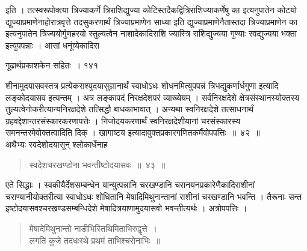 \documentclass[11pt, openany]{book}
\begin{document}
\begin{sloppypar}
इति । तत्स्वरूपोक्त्या त्रिज्याकर्णे त्रिराशिद्युज्या कोटिस्तदैकद्वित्रिराशिज्याकर्णेषु का इत्यनुपातेन कोटयो द्युज्याप्रमाणेनाहोरात्रवृत्ते तदसुकरणार्थं त्रिज्याप्रमाणेन साध्या इति द्युज्याप्रमाणेनैतास्तदा त्रिज्याप्रमाणेन का इत्यनुपातेन त्रिज्ययोर्गुणहरयो स्तुल्यत्वेन नाशादेकादिराशि ज्यास्त्रि राशिद्युज्यया गुण्याः स्वद्युज्यया भक्ता इत्युपपन्नाः । आसां धनूंव्येकादिरा\textendash
\end{sloppypar}


\newpage

\hspace{3cm}  गूढार्थप्रकाशकेन सहितः~। \hfill १४१
\vspace{1cm}

\begin{sloppypar}
शीनामुदयासवस्तत्र प्रत्येकराश्युदयासुज्ञानार्थं स्वाधोऽधः शोधनमित्युपपन्नं त्रिभद्युकर्णार्धगुणा इत्यादि लङ्कोदयासव इत्यन्तम् । अत्र लङ्कापदं निरक्षदेशपरं व्याख्येयम् । सर्वनिरक्षदेशे क्षेत्रसंस्थानस्योक्तस्य तुल्यत्वेनोकरीत्यान्यनिरक्षदेशे तत्सिद्धौ बाधकाभावात् । अन्यथा स्वनिरक्षदेशे तत्साधनार्थं ग्रहवद्देशान्तरसंस्कारकरणापत्तेः । निजोदयकरणार्थं स्वनिरक्षदेशीयानां चरसंस्कारस्य समनन्तरमेवोक्तत्वादिति दिक् । खागाष्टय इत्यादावुक्तप्रकारगणितकर्मैवोपपत्तिः~॥~४२~॥\\
\noindent अथैभ्यः स्वदेशोदयासून् श्लोकार्धेनाह\textendash
\end{sloppypar}


\begin{quote}
 {\ssi स्वदेशचरखण्डोना भवन्तीष्टोदयासवः~॥~४३~॥}
 \end{quote}

\begin{sloppypar}
 एते सिद्धाः । स्वकीयैर्देशसम्बन्धेन यान्युत्पन्नानि चरखण्डानि चरानयनप्रकारेणैकादिराशीनां चराण्यानीयोक्तरीत्या स्वाधोऽधः शोधितानि मेषादिमिथुनान्तानां राशीनां चरखण्डानि भवन्ति । तैरूनाः सन्त इष्टोदयासवश्चरखण्डसम्बन्धिदेशे मेषादित्रयाणामुदयासवो भवन्तीत्यर्थः । अत्रोपपत्तिः ।
\end{sloppypar}


\begin{quote}
 {\qt मेषादेमिथुनान्तो नाडीभिस्तिथिमिताभिरुद्वृत्ते~।\\
 लगति कुजे तदधःस्थे प्रथमं ताभिश्चरोनाभिः~॥}
 \end{quote}
 
\end{document}
